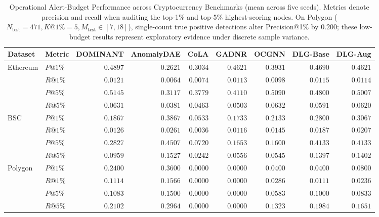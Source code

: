 \documentclass[applsci,article,submit,moreauthors,pdftex]{Definitions/mdpi}
\begin{document}
\begin{table}[htbp]
\centering\small\setlength{\tabcolsep}{3.5pt}
\caption{Operational Alert-Budget Performance across Cryptocurrency Benchmarks (mean across five seeds). Metrics denote precision and recall when auditing the top-1\% and top-5\% highest-scoring nodes. On Polygon ($N_{\mathrm{test}}=471, K@1\%=5, M_{\mathrm{test}} \in [7, 18]$), single-count true positive detections alter Precision@1\% by $0.200$; these low-budget results represent exploratory evidence under discrete sample variance.}
\label{tab:alert_budget}
\begin{tabularx}{\textwidth}{llrrrrrrr}\toprule
\textbf{Dataset} & \textbf{Metric} & \textbf{DOMINANT} & \textbf{AnomalyDAE} & \textbf{CoLA} & \textbf{GADNR} & \textbf{OCGNN} & \textbf{DLG-Base} & \textbf{DLG-Aug} \\\midrule
\multirow{4}{*}{Ethereum} & $P@1\%$ & $\mathbf{0.4897}$ & $0.2621$ & $0.3034$ & $0.4621$ & $0.3931$ & $0.4690$ & $0.4621$ \\
 & $R@1\%$ & $\mathbf{0.0121}$ & $0.0064$ & $0.0074$ & $0.0113$ & $0.0098$ & $0.0115$ & $0.0114$ \\
 & $P@5\%$ & $\mathbf{0.5145}$ & $0.3117$ & $0.3779$ & $0.4110$ & $0.5090$ & $0.4800$ & $0.5007$ \\
 & $R@5\%$ & $0.0631$ & $0.0381$ & $0.0463$ & $0.0503$ & $\mathbf{0.0632}$ & $0.0591$ & $0.0620$ \\
\midrule
\multirow{4}{*}{BSC} & $P@1\%$ & $0.1867$ & $\mathbf{0.3867}$ & $0.0533$ & $0.1733$ & $0.2133$ & $0.2800$ & $0.3067$ \\
 & $R@1\%$ & $0.0126$ & $\mathbf{0.0261}$ & $0.0036$ & $0.0116$ & $0.0145$ & $0.0187$ & $0.0207$ \\
 & $P@5\%$ & $0.2827$ & $\mathbf{0.4507}$ & $0.0720$ & $0.1653$ & $0.1600$ & $0.4133$ & $0.4133$ \\
 & $R@5\%$ & $0.0959$ & $\mathbf{0.1527}$ & $0.0242$ & $0.0556$ & $0.0545$ & $0.1397$ & $0.1402$ \\
\midrule
\multirow{4}{*}{Polygon} & $P@1\%$ & $0.2400$ & $\mathbf{0.3600}$ & $0.0000$ & $0.0000$ & $0.0400$ & $0.0400$ & $0.0800$ \\
 & $R@1\%$ & $0.1114$ & $\mathbf{0.1566}$ & $0.0000$ & $0.0000$ & $0.0286$ & $0.0111$ & $0.0236$ \\
 & $P@5\%$ & $0.1083$ & $\mathbf{0.1500}$ & $0.0000$ & $0.0000$ & $0.0583$ & $0.1000$ & $0.0833$ \\
 & $R@5\%$ & $0.2102$ & $\mathbf{0.2964}$ & $0.0000$ & $0.0000$ & $0.1323$ & $0.1984$ & $0.1651$ \\
\bottomrule
\end{tabularx}
\end{table}
\end{document}
